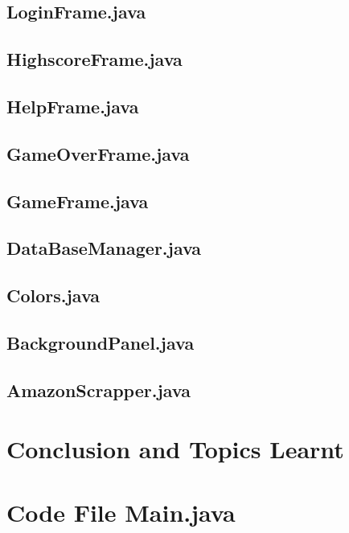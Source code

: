 \documentclass[11pt]{article}
\begin{document}
\subsection{LoginFrame.java}

\subsection{HighscoreFrame.java}

\subsection{HelpFrame.java}

\subsection{GameOverFrame.java}

\subsection{GameFrame.java}

\subsection{  DataBaseManager.java}

\subsection{  Colors.java}

\subsection{  BackgroundPanel.java}

\subsection{  AmazonScrapper.java}

\section{Conclusion and Topics Learnt}

\section{Code File Main.java}


\end{document}
